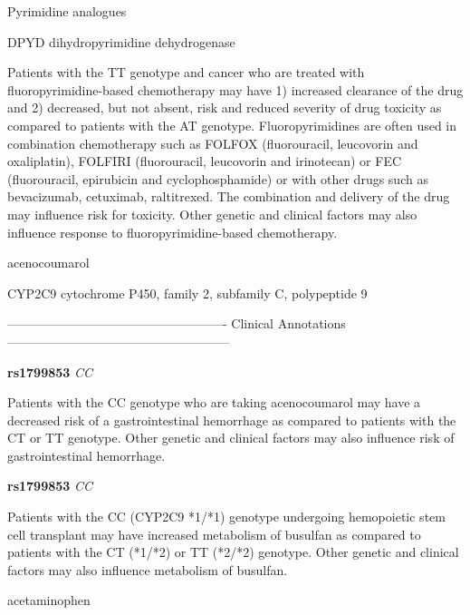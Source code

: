 \documentclass{resume} %
\begin{document}
\begin{rSection}{ Pyrimidine analogues }
\begin{rSubsection}{ DPYD }{ dihydropyrimidine dehydrogenase }{}{}
\item[] Patients with the TT genotype and cancer who are treated with fluoropyrimidine-based chemotherapy may have 1) increased clearance of the drug and 2) decreased, but not absent, risk and reduced severity of drug toxicity as compared to patients with the AT genotype. Fluoropyrimidines are often used in combination chemotherapy such as FOLFOX (fluorouracil, leucovorin and oxaliplatin), FOLFIRI (fluorouracil, leucovorin and irinotecan) or FEC (fluorouracil, epirubicin and cyclophosphamide) or with other drugs such as bevacizumab, cetuximab, raltitrexed. The combination and delivery of the drug may influence risk for toxicity. Other genetic and clinical factors may also influence response to fluoropyrimidine-based chemotherapy.
\end{rSubsection}

\end{rSection}\begin{rSection}{ acenocoumarol }
\item[]

\begin{rSubsection}{ CYP2C9 }{ cytochrome P450, family 2, subfamily C, polypeptide 9 }{}{}
\item[]

\item[] ---------------------------------------------------- Clinical Annotations -----------------------------------------------------\newline
\item \textbf{ rs1799853 } \textit{ CC }
\item[] Patients with the CC genotype who are taking acenocoumarol may have a decreased risk of a gastrointestinal hemorrhage as compared to patients with the CT or TT genotype. Other genetic and clinical factors may also influence risk of gastrointestinal hemorrhage.\item \textbf{ rs1799853 } \textit{ CC }
\item[] Patients with the CC (CYP2C9 *1/*1) genotype undergoing hemopoietic stem cell transplant may have increased metabolism of busulfan as compared to patients with the CT (*1/*2) or TT (*2/*2) genotype. Other genetic and clinical factors may also influence metabolism of busulfan.
\end{rSubsection}

\end{rSection}\begin{rSection}{ acetaminophen }
\item[]


\end{rSection}
\end{document}
